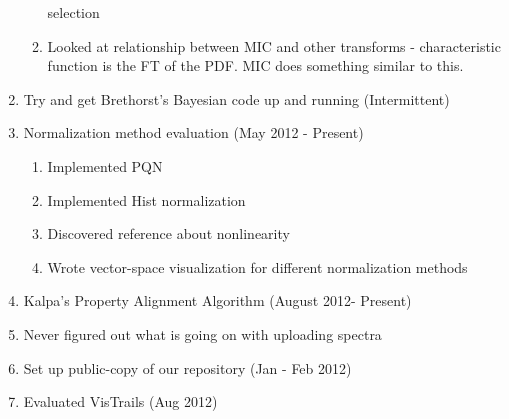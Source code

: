 \documentclass[english]{article}
\begin{document}
\begin{enumerate}
\begin{enumerate}
            selection
      \item Looked at relationship between MIC and other transforms -
            characteristic function is the FT of the PDF. MIC does something
            similar to this. 
      \end{enumerate}
\item Try and get Brethorst's Bayesian code up and running (Intermittent)
\item Normalization method evaluation (May 2012 - Present)
      \begin{enumerate}
      \item Implemented PQN
      \item Implemented Hist normalization
      \item Discovered reference about nonlinearity
      \item Wrote vector-space visualization for different normalization methods
      \end{enumerate}
\item Kalpa's Property Alignment Algorithm (August 2012- Present)
\item Never figured out what is going on with uploading spectra
\item Set up public-copy of our repository (Jan - Feb 2012)
\item Evaluated VisTrails (Aug 2012)
\end{enumerate}
\end{document}
